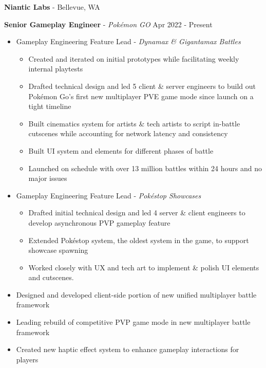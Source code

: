 \documentclass[resmargin,10pt]{res} %
\begin{document}
\begin{resume}
     {\bf Niantic Labs} - Bellevue, WA \\
    \begin{ncolumn}{1}
        {\bf Senior Gameplay Engineer} - \textit{Pokémon GO} \hfill Apr 2022 - Present
    \end{ncolumn}
    \begin{itemize}
        \setlength\itemsep{-0.1em}
        \item Gameplay Engineering Feature Lead - \textit{Dynamax \& Gigantamax Battles}
        \begin{itemize}[leftmargin=0.5em,topsep=0.0em]
            \setlength\itemsep{-0.0em}
            \item Created and iterated on initial prototypes while facilitating weekly internal playtests
            \item Drafted technical design and led 5 client \& server engineers to build out Pokémon Go's first new multiplayer PVE game mode since launch on a tight timeline
            \item Built cinematics system for artists \& tech artists to script in-battle cutscenes while accounting for network latency and consistency
            \item Built UI system and elements for different phases of battle
            \item Launched on schedule with over 13 million battles within 24 hours and no major issues
        \end{itemize}
        \item Gameplay Engineering Feature Lead - \textit{Pokéstop Showcases}
        \begin{itemize}[leftmargin=0.5em,topsep=0.0em]
            \setlength\itemsep{-0.0em}
            \item Drafted initial technical design and led 4 server \& client engineers to develop asynchronous PVP gameplay feature
            \item Extended Pokéstop system, the oldest system in the game, to support showcase spawning
            \item Worked closely with UX and tech art to implement \& polish UI elements and cutscenes.
        \end{itemize}
        \item Designed and developed client-side portion of new unified multiplayer battle framework
        \item Leading rebuild of competitive PVP game mode in new multiplayer battle framework
        \item Created new haptic effect system to enhance gameplay interactions for players

\end{itemize}
\end{resume}
\end{document}

